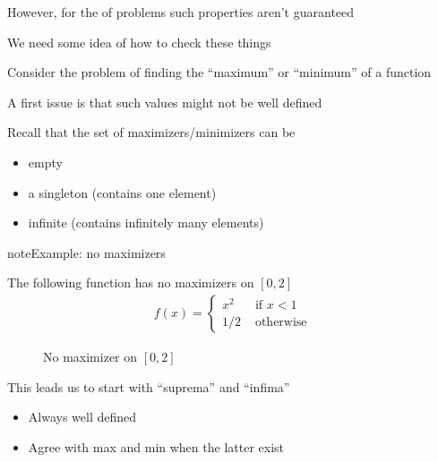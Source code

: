 \documentclass[letterpaper,10pt,english]{jupyterBook}
\begin{document}
\sphinxAtStartPar
However, for the  of problems such properties aren’t guaranteed

\sphinxAtStartPar
We need some idea of how to check these things

\sphinxAtStartPar
Consider the problem of finding the “maximum” or “minimum” of a function

\sphinxAtStartPar
A first issue is that such values might not be well defined

\sphinxAtStartPar
Recall that the set of maximizers/minimizers can be
\begin{itemize}
\item {} 
\sphinxAtStartPar
empty

\item {} 
\sphinxAtStartPar
a singleton (contains one element)

\item {} 
\sphinxAtStartPar
infinite (contains infinitely many elements)

\end{itemize}

\begin{sphinxadmonition}{note}{Example: no maximizers}

\sphinxAtStartPar
The following function has no maximizers on \([0, 2]\)
\begin{equation*}
\begin{split}
f(x) = 
\begin{cases}
x^2 &  \text{ if } x < 1
\\
1/2 &  \text{ otherwise}
\end{cases}
\end{split}
\end{equation*}
\begin{figure}[H]
\centering
\capstart

\noindent{}
\caption{No maximizer on \([0, 2]\)}\label{\detokenize{06.optimization_fundamentals:id1}}\end{figure}
\end{sphinxadmonition}

\sphinxAtStartPar
This leads us to start with “suprema” and “infima”
\begin{itemize}
\item {} 
\sphinxAtStartPar
Always well defined

\item {} 
\sphinxAtStartPar
Agree with max and min when the latter exist

\end{itemize}
\end{document}
